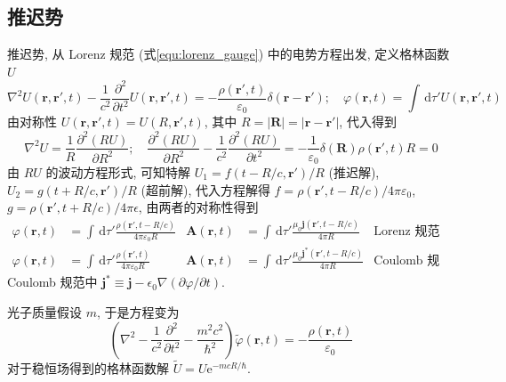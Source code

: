 \documentclass[12pt,a4paper]{article}%
\numberwithin{equation}{section}%
\renewcommand*{\vec}[1]{\bm{#1}}%
\newcommand{\dif}{\,\mathrm d}
\newcommand\e{\mathrm{e}}%
\begin{document}
\subsection{推迟势} %
\label{sub:retarded_potential}
推迟势, 从 Lorenz 规范 (式\ref{equ:lorenz_gauge}) 中的电势方程出发, 定义格林函数 $U$
\begin{equation}
    \nabla^2 U(\vec r,\vec r', t) - \frac 1{c^2}\frac{\partial^2}{\partial t^2} U(\vec r,\vec r', t) = -\frac{\rho(\vec r',t)}{\varepsilon_0}\delta(\vec r - \vec r');\quad 
    \varphi(\vec r, t) = \int\dif \tau' U(\vec r, \vec r', t)
\end{equation}
由对称性 $U(\vec r,\vec r', t) = U(R,\vec r', t)$, 
其中 $R = |\vec R| = |\vec r - \vec r'|$, 代入得到
\begin{equation}
    \nabla^2 U = \frac 1R\frac{\partial^2(RU)}{\partial R^2};\quad 
    \frac{\partial^2 (RU)}{\partial R^2} - \frac 1{c^2}\frac{\partial^2(RU)}{\partial t^2} = -\frac 1{\varepsilon_0}\delta(\vec R)\rho(\vec r',t)R = 0
\end{equation}
由 $RU$ 的波动方程形式, 可知特解 $U_1 = f(t-R/c,\vec r')/R$ (推迟解), $U_2 = g(t+R/c,\vec r')/R$ (超前解), 代入方程解得 $f = \rho(\vec r',t-R/c)/4\pi\varepsilon_0$, $g = \rho(\vec r', t+R/c)/4\pi\epsilon$, 由两者的对称性得到
\begin{align}
    \varphi(\vec r, t) &= \int\dif \tau'\frac{\rho(\vec r',t-R/c)}{4\pi\varepsilon_0 R} 
    &\vec A(\vec r, t) &= \int\dif \tau'\frac{\mu_0\vec j(\vec r', t-R/c)}{4\pi R}
    &\mbox{Lorenz 规范} \label{equ:retarded_potential_lg}\\
    \varphi(\vec r, t) &= \int\dif \tau'\frac{\rho(\vec r',t)}{4\pi\varepsilon_0 R} 
    &\vec A(\vec r, t) &= \int\dif \tau'\frac{\mu_0\vec j^*(\vec r', t-R/c)}{4\pi R}
    &\mbox{Coulomb 规范}
\end{align}
Coulomb 规范中 $\vec j^*\equiv \vec j - \epsilon_0\nabla(\partial\varphi/\partial t)$.

光子质量假设 $m$, 于是方程变为
\begin{equation}
    \left(\nabla^2 - \frac 1{c^2}\frac{\partial^2}{\partial t^2} - \frac{m^2c^2}{\hbar^2}\right)\tilde\varphi(\vec r, t) = -\frac{\rho(\vec r,t)}{\varepsilon_0}
\end{equation}
对于稳恒场得到的格林函数解 $\tilde U = U\e^{-mcR/\hbar}$. 
\end{document}
